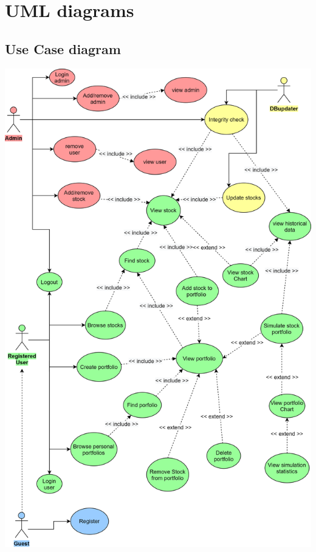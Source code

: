 \chapter{UML diagrams}

\section{Use Case diagram}
{\centering
\includegraphics[scale=0.13]{img/use_case.png}\\
}
